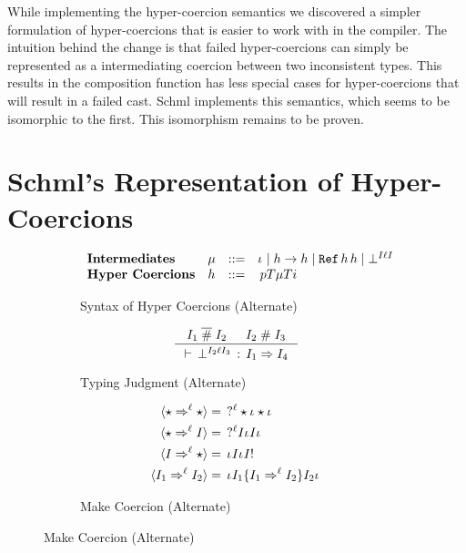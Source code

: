 \documentclass[acmtog, authorversion, acmlarge]{acmart}
\begin{document}
\clearpage

While implementing the hyper-coercion semantics we discovered
a simpler formulation of hyper-coercions that is easier to work
with in the compiler. The intuition behind the change
is that failed hyper-coercions can simply be represented as a
intermediating coercion between two inconsistent types.
This results in the composition function has less
special cases for hyper-coercions that will result in a failed
cast. Schml implements this semantics, which seems to be
isomorphic to the first. This isomorphism remains to be proven.

\section{Schml's Representation of Hyper-Coercions}
\begin{figure}[tbh]
  \centering
  \begin{subfigure}{.5\textwidth}
    \[
    \begin{array}{llcl}
      \textbf{Intermediates}&
      \Med  & ::= & \id \mid \fn{\HC}{\HC} \mid \rf{\HC}{\HC} %
                  \mid \failed{\I}{\Lbl}{\I}\\
      \textbf{Hyper Coercions}&
      \HC   & ::= & \hc{\Prj}{\T}{\Med}{\T}{\Inj}
    \end{array}
    \]
    \caption{Syntax of Hyper Coercions (Alternate)}
    \label{fig:CompilerhcSyntax}
  \end{subfigure}%
  \begin{subfigure}{.5\textwidth}
    \begin{gather*}
      \inference{\I_1 \sct \I_2 & \I_2 \sic \I_3}
                {\cwt{\failed{\I_2}{\Lbl}{\I_3}}{\I_1}{\I_4}}
    \end{gather*}
    \caption{Typing Judgment (Alternate)}
    \label{fig:CompilerTyping}
  \end{subfigure}
  \begin{subfigure}{.35\textwidth}
    \begin{align*}
      \langle \star \Rightarrow^{\ell} \star \rangle &= \; \,  ?^{\ell} \star \iota_{} \star \iota_{} \,\\
      \langle \star \Rightarrow^{\ell} I \rangle   &= \; \,  ?^{\ell} I \iota_{} I \iota_{} \, \\
      \langle I \Rightarrow^{\ell} \star \rangle   &= \, \iota_{} I \iota_{} I  ! \, \\
      \langle I_1 \Rightarrow^{\ell} I_2 \rangle &= \, \iota_{} I_1 \{ I_1 \Rightarrow^{\ell} I_2 \} I_2 \iota_{} \,
    \end{align*}
    \caption{Make Coercion (Alternate)}

\end{subfigure}
\end{figure}
\end{document}
